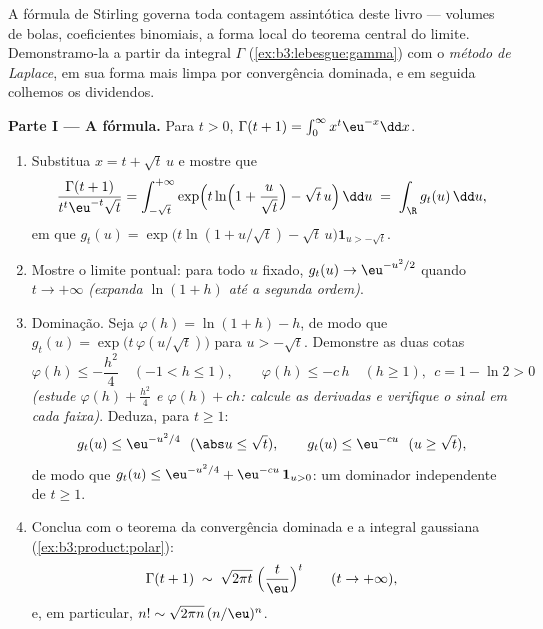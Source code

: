 \begin{problem}
\label{pb:b3:product:1}
A fórmula de Stirling governa toda contagem assintótica deste livro ---
volumes de bolas, coeficientes binomiais, a forma local do teorema
central do limite. Demonstramo-la a partir da integral $\Gamma$
(\cref{ex:b3:lebesgue:gamma}) com o \emph{método de Laplace}, em sua forma mais limpa
por convergência dominada, e em seguida colhemos os
dividendos.

\medskip
\noindent\textbf{Parte I --- A fórmula.} Para $t > 0$, $\Gamma(t + 1) = \int_0^\infty x^{t}\eu^{-x}\dd x$.
\begin{enumerate}
  \item Substitua $x = t + \sqrt t\,u$ e mostre que
        \[
        \frac{\Gamma(t+1)}{t^{t}\eu^{-t}\sqrt t}
        = \int_{-\sqrt t}^{+\infty}
        \exp\Bigl(t\ln\Bigl(1 + \frac u{\sqrt
        t}\Bigr) - \sqrt t\,u\Bigr)\,\dd u
        \;=\;\int_\R g_t(u)\,\dd u,
        \]
        em que $g_t(u) = \exp\bigl(t\ln(1 + u/\sqrt t) -
        \sqrt t\,u\bigr)\mathbf 1_{u > -\sqrt t}$.
  \item Mostre o limite pontual: para todo $u$ fixado, $g_t(u)
        \to \eu^{-u^2/2}$ quando
        $t \to +\infty$ \emph{(expanda $\ln(1 + h)$ até a segunda ordem)}.
  \item Dominação. Seja $\varphi(h) = \ln(1 + h) - h$, de modo que $g_t(u) = \exp\bigl(t\,\varphi(u/\sqrt t)\bigr)$ para $u > -\sqrt t$. Demonstre as
        duas cotas
        \[
        \varphi(h) \leq -\frac{h^2}4 \quad (-1 < h \leq 1),
        \qquad
        \varphi(h) \leq -c\,h \quad (h \geq 1),\ \ c = 1 -
        \ln 2 > 0
        \]
        \emph{(estude $\varphi(h) + \frac{h^2}4$ e $\varphi(h)
        + ch$: calcule as derivadas e verifique o
        sinal em cada faixa)}. Deduza, para $t \geq 1$:
        \[
        g_t(u) \leq \eu^{-u^2/4}\ \ (\abs u \leq \sqrt t),
        \qquad
        g_t(u) \leq \eu^{-cu}\ \ (u \geq \sqrt t),
        \]
        de modo que $g_t(u) \leq \eu^{-u^2/4} +
        \eu^{-cu}\,\mathbf 1_{u > 0}$: um dominador  independente de
        $t \geq 1$.
  \item Conclua com o teorema da convergência dominada e a integral
        gaussiana (\cref{ex:b3:product:polar}):
        \[
        \Gamma(t + 1) \;\sim\;
        \sqrt{2\pi t}\;\Bigl(\frac t\eu\Bigr)^{t}
        \qquad (t \to +\infty),
        \]
        e, em particular, $n! \sim \sqrt{2\pi
        n}\,(n/\eu)^n$.
\end{enumerate}


\end{problem}
